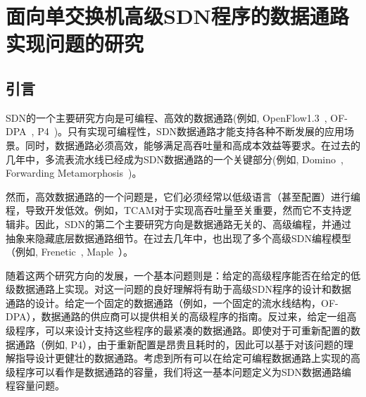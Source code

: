 \chapter{面向单交换机高级SDN程序的数据通路实现问题的研究}


%


\section{引言}\label{sec:introduction}
SDN的一个主要研究方向是可编程、高效的数据通路(例如, OpenFlow1.3~\cite{openflow1-3}, OF-DPA~\cite{OF-DPA}, P4~\cite{P4})。只有实现可编程性，SDN数据通路才能支持各种不断发展的应用场景。同时，数据通路必须高效，能够满足高吞吐量和高成本效益等要求。在过去的几年中，多流表流水线已经成为SDN数据通路的一个关键部分(例如, Domino~\cite{sivaraman2016packet}, Forwarding Metamorphosis~\cite{rmt})。



然而，高效数据通路的一个问题是，它们必须经常以低级语言（甚至配置）进行编程，导致开发低效。例如，TCAM对于实现高吞吐量至关重要，然而它不支持逻辑非。因此，SDN的第二个主要研究方向是数据通路无关的、高级编程，并通过抽象来隐藏底层数据通路细节。在过去几年中，也出现了多个高级SDN编程模型（例如, Frenetic~\cite{foster2011frenetic}, Maple~\cite{maple}）。

随着这两个研究方向的发展，一个基本问题则是：给定的高级程序能否在给定的低级数据通路上实现。对这一问题的良好理解将有助于高级SDN程序的设计和数据通路的设计。给定一个固定的数据通路（例如，一个固定的流水线结构，OF-DPA），数据通路的供应商可以提供相关的高级程序的指南。反过来，给定一组高级程序，可以来设计支持这些程序的最紧凑的数据通路。即使对于可重新配置的数据通路（例如, P4），由于重新配置是昂贵且耗时的，因此可以基于对该问题的理解指导设计更健壮的数据通路。考虑到所有可以在给定可编程数据通路上实现的高级程序可以看作是数据通路的容量，我们将这一基本问题定义为SDN数据通路编程容量问题。


